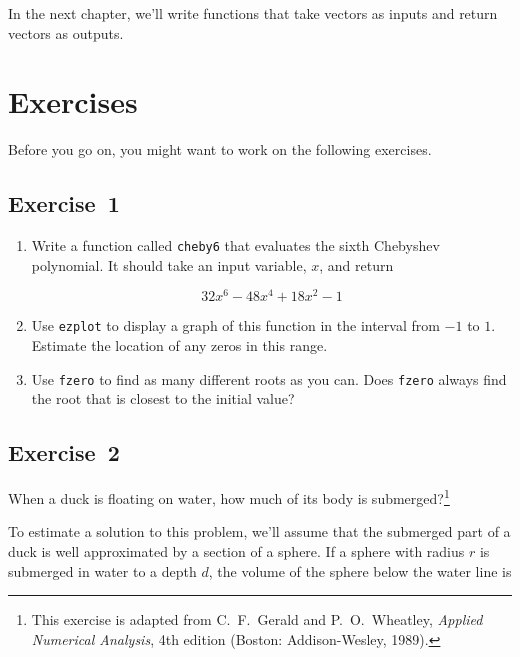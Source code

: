 In the next chapter, we'll write functions that take vectors as inputs and return vectors as outputs.


\section{Exercises}

Before you go on, you might want to work on the following exercises.

\subsection{Exercise~1}

\begin{enumerate}


\item Write a function called \lstinline{cheby6} that evaluates the
sixth Chebyshev polynomial.  It should take an input variable,
$x$, and return

\begin{equation*}
32 x^6 - 48 x^4 + 18 x^2 - 1
\end{equation*}

\item Use \lstinline{ezplot} to display a graph of this function in the
interval from $-1$ to $1$.  Estimate the location of any zeros in this
range.

\item Use \lstinline{fzero} to find as many different roots as you can.
Does \lstinline{fzero} always find the root that is closest to the initial
value?

\end{enumerate}



\subsection{Exercise~2}
\label{duck}

When a duck is floating on water, how much of its body is submerged?\footnote{This exercise is adapted from C.~F.~Gerald and P.~O.~Wheatley, \emph{Applied Numerical Analysis}, 4th edition (Boston: Addison-Wesley, 1989).}


To estimate a solution to this problem, we'll assume that the submerged part of a duck is well approximated by a section of a sphere.
If a sphere with radius $r$ is submerged in water to a depth $d$, the
volume of the sphere below the water line is

